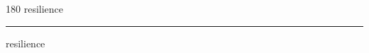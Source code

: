 
\begin{frame}
\begin{center}
\begin{turn}{180}
{\fontsize{2.5cm}{1em}\selectfont resilience}
\end{turn}
\vspace{1em}\par  
\hrule
\vspace{1em}\par  
{\fontsize{2.5cm}{1em}\selectfont resilience}
\end{center}
\end{frame}
